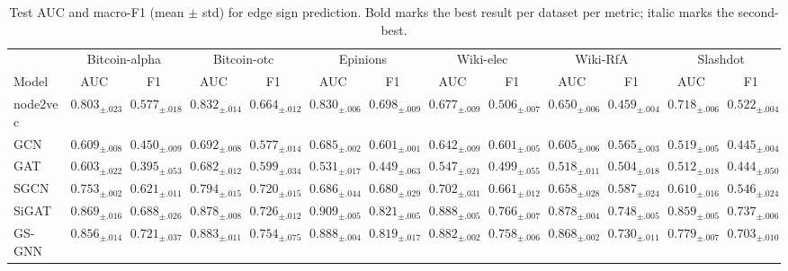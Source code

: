 \documentclass[sigconf]{acmart}
\theoremstyle{plain}
\theoremstyle{definition}
\begin{document}
\begin{table}[t!]
\centering
\scriptsize
\caption{Test AUC and macro-F1 (mean $\pm$ std) for edge sign prediction. Bold marks the best result per dataset per metric; italic marks the second-best.}
\label{tab:result1}
\setlength{\tabcolsep}{3.6pt}
\renewcommand{\arraystretch}{0.92}
\begin{tabular}{l*{6}{cc}}
\toprule
& \multicolumn{2}{c}{Bitcoin-alpha} & \multicolumn{2}{c}{Bitcoin-otc} & \multicolumn{2}{c}{Epinions} & \multicolumn{2}{c}{Wiki-elec} & \multicolumn{2}{c}{Wiki-RfA} & \multicolumn{2}{c}{Slashdot} \\
\cmidrule(lr){2-3}\cmidrule(lr){4-5}\cmidrule(lr){6-7}\cmidrule(lr){8-9}\cmidrule(lr){10-11}\cmidrule(lr){12-13}
Model & AUC & F1 & AUC & F1 & AUC & F1 & AUC & F1 & AUC & F1 & AUC & F1 \\
\midrule
node2vec & $0.803_{\pm.023}$ & $0.577_{\pm.018}$ & $0.832_{\pm.014}$ & $0.664_{\pm.012}$ & $0.830_{\pm.006}$ & $0.698_{\pm.009}$ & $0.677_{\pm.009}$ & $0.506_{\pm.007}$ & $0.650_{\pm.006}$ & $0.459_{\pm.004}$ & $0.718_{\pm.006}$ & $0.522_{\pm.004}$ \\
\midrule
GCN & $0.609_{\pm.008}$ & $0.450_{\pm.009}$ & $0.692_{\pm.008}$ & $0.577_{\pm.014}$ & $0.685_{\pm.002}$ & $0.601_{\pm.001}$ & $0.642_{\pm.009}$ & $0.601_{\pm.005}$ & $0.605_{\pm.006}$ & $0.565_{\pm.003}$ & $0.519_{\pm.005}$ & $0.445_{\pm.004}$ \\
GAT & $0.603_{\pm.022}$ & $0.395_{\pm.053}$ & $0.682_{\pm.012}$ & $0.599_{\pm.034}$ & $0.531_{\pm.017}$ & $0.449_{\pm.063}$ & $0.547_{\pm.021}$ & $0.499_{\pm.055}$ & $0.518_{\pm.011}$ & $0.504_{\pm.018}$ & $0.512_{\pm.018}$ & $0.444_{\pm.050}$ \\
SGCN & $0.753_{\pm.002}$ & $0.621_{\pm.011}$ & $0.794_{\pm.015}$ & $0.720_{\pm.015}$ & $0.686_{\pm.044}$ & $0.680_{\pm.029}$ & $0.702_{\pm.031}$ & $0.661_{\pm.012}$ & $0.658_{\pm.028}$ & $0.587_{\pm.024}$ & $0.610_{\pm.016}$ & $0.546_{\pm.024}$ \\
SiGAT & $0.869_{\pm.016}$ & $0.688_{\pm.026}$ & $0.878_{\pm.008}$ & $0.726_{\pm.012}$ & $0.909_{\pm.005}$ & $0.821_{\pm.005}$ & $0.888_{\pm.005}$ & $0.766_{\pm.007}$ & $0.878_{\pm.004}$ & $0.748_{\pm.005}$ & $0.859_{\pm.005}$ & $0.737_{\pm.006}$ \\
GS-GNN & $0.856_{\pm.014}$ & $\mathit{0.721_{\pm.037}}$ & $0.883_{\pm.011}$ & $0.754_{\pm.075}$ & $0.888_{\pm.004}$ & $0.819_{\pm.017}$ & $0.882_{\pm.002}$ & $0.758_{\pm.006}$ & $0.868_{\pm.002}$ & $0.730_{\pm.011}$ & $0.779_{\pm.007}$ & $0.703_{\pm.010}$ \\

\end{tabular}
\end{table}
\end{document}
